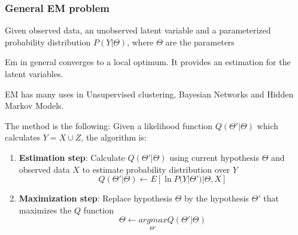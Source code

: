 \subsubsection{General EM problem}
Given observed data, an unobserved latent variable and a parameterized probability distribution $P(Y|\Theta)$, where $\Theta$ are the parameters

Em in general converges to a local optimum. It provides an estimation for the latent variables.

EM has many uses in Unsupervised clustering, Bayesian Networks and Hidden Markov Models.

The method is the following: Given a likelihood function $Q(\Theta'|\Theta)$ which calculates $Y = X \cup Z$, the algorithm is:
\begin{enumerate}
    \item \textbf{Estimation step}: Calculate $Q(\Theta'|\Theta)$ using current hypothesis $\Theta$ and observed data $X$ to estimate probability distribution over $Y$
    \begin{equation}
        Q(\Theta'|\Theta) \xleftarrow{} E[\ln P(Y|\Theta')|\Theta, X]
    \end{equation}
    \item \textbf{Maximization step}: Replace hypothesis $\Theta$ by the hypothesis $\Theta'$ that maximizes the $Q$ function
    \begin{equation}
        \Theta \xleftarrow{} \underset{\Theta'}{argmax} Q(\Theta'|\Theta)
    \end{equation}
\end{enumerate}


